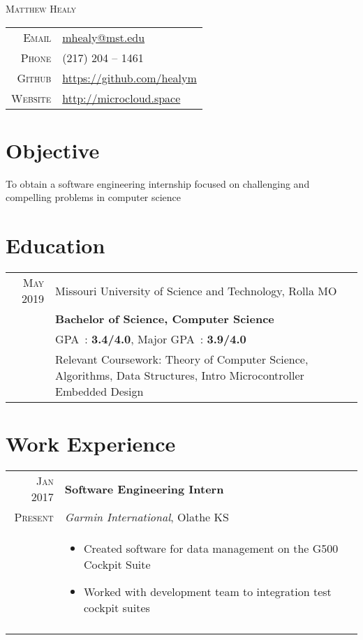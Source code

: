 \documentclass[a4paper,10pt]{article}
\newcommand{\br}{\\\multicolumn{2}{c}{}}
\begin{document}
\pagestyle{empty}

\par{\centering
    {\Huge \textsc{Matthew Healy}
}\bigskip\par}

\begin{center}
\begin{tabular}{rl}
    \textsc{Email } & \href{mailto:mhealy@mst.edu}{mhealy@mst.edu} \\
    \textsc{Phone }        & (217) 204 -- 1461  \\
    \textsc{Github }       & \url{https://github.com/healym} \\
    \textsc{Website }      & \url{http://microcloud.space}
\end{tabular}
\end{center}

\section{Objective}
To obtain a software engineering internship focused on challenging and compelling problems in computer science


\section{Education}
\begin{tabular}{r|p{15cm}}
    \textsc{May} 2019 & Missouri University of Science and Technology, Rolla MO  \\
                      & \textbf{Bachelor of Science, Computer Science} \\
                      & GPA~: \textbf{3.4/4.0}, Major GPA~: \textbf{3.9/4.0} \\
                      & Relevant Coursework:
                      Theory of Computer Science,
                      Algorithms,
                      Data Structures,
                      Intro Microcontroller Embedded Design
\end{tabular}


\section{Work Experience}

\begin{tabular}{r|p{15cm}}
    \textsc{Jan 2017} & \textbf{Software Engineering Intern} \\
    \textsc{Present}  & \textit{Garmin International}, Olathe KS \\ &
    \begin{itemize}
    \item Created software for data management on the G500 Cockpit Suite
    \item Worked with development team to integration test cockpit suites

    \end{itemize} \br\\

\end{tabular}
\end{document}
